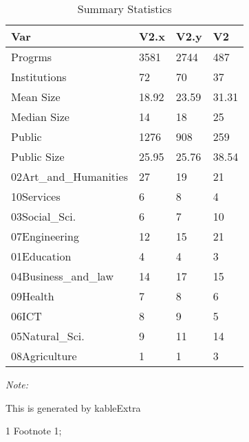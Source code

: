 \begin{table}
\centering
\caption{Summary Statistics}
\centering
\begin{threeparttable}
\begin{tabular}[t]{llll}
\toprule
Var & V2.x & V2.y & V2\\
\midrule
Progrms & 3581 & 2744 & 487\\
Institutions & 72 & 70 & 37\\
Mean Size & 18.92 & 23.59 & 31.31\\
Median Size & 14 & 18 & 25\\
Public & 1276 & 908 & 259\\
\addlinespace
Public Size & 25.95 & 25.76 & 38.54\\
02Art\_and\_Humanities & 27 & 19 & 21\\
10Services & 6 & 8 & 4\\
03Social\_Sci. & 6 & 7 & 10\\
07Engineering & 12 & 15 & 21\\
\addlinespace
01Education & 4 & 4 & 3\\
04Business\_and\_law & 14 & 17 & 15\\
09Health & 7 & 8 & 6\\
06ICT & 8 & 9 & 5\\
05Natural\_Sci. & 9 & 11 & 14\\
\addlinespace
08Agriculture & 1 & 1 & 3\\
\bottomrule
\end{tabular}
\begin{tablenotes}
\item \textit{Note: } 
\item This is generated by kableExtra
\item[1] Footnote 1; 
\end{tablenotes}
\end{threeparttable}
\end{table}
